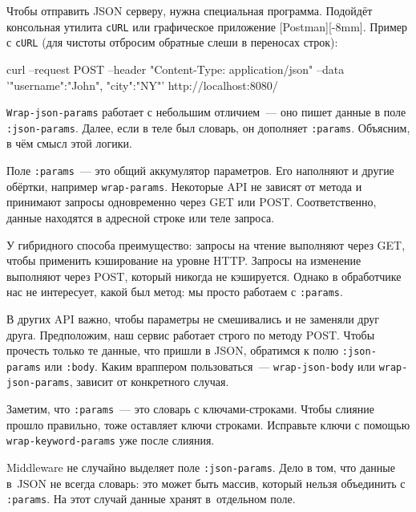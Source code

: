 \fi


Чтобы отправить JSON серверу, нужна специальная программа. Подойдёт консольная
утилита \verb|cURL| или графическое приложение
[Post\-man][-8mm]. Пример с
\verb|cURL| (для чистоты отбросим обратные слеши в переносах строк):

\begin{english}
  \begin{bash}
curl --request POST
     --header "Content-Type:
                 application/json"
     --data '{"username":"John",
                      "city":"NY"}'
     http://localhost:8080/
  \end{bash}
\end{english}

\mnoindent \verb|Wrap-json-params| работает с небольшим отличием~--- оно пишет
данные в поле \verb|:json-params|. Далее, если в теле был словарь, он дополняет
\verb|:params|. Объясним, в чём смысл этой логики.

Поле \verb|:params|~--- это общий аккумулятор параметров. Его наполняют и другие
обёртки, например \verb|wrap-params|. Некоторые API не зависят от метода и
принимают запросы одновременно через GET или POST. Соответственно, данные
находятся в адресной строке или теле запроса.

У гибридного способа преимущество: запросы на чтение выполняют через GET, чтобы
применить кэширование на уровне HTTP. Запросы на изменение выполняют через POST,
который никогда не кэшируется. Однако в обработчике нас не интересует, какой был
метод: мы просто работаем с \verb|:params|.

В других API важно, чтобы параметры не смешивались и не заменяли друг
друга. Предположим, наш сервис работает строго по методу POST. Чтобы прочесть
только те данные, что пришли в JSON, обратимся к полю \verb|:json-params| или
\verb|:body|. Каким враппером пользоваться~--- \verb|wrap-json-body| или
\verb|wrap-json-params|, зависит от конкретного случая.


Заметим, что \verb|:params|~--- это словарь с клю\-ча\-ми-стро\-ка\-ми. Чтобы слияние
прошло правильно, \verb|| тоже оставляет ключи
строками. Исправьте ключи с помощью \texttt{wrap-keyword-params} уже после
слияния.

Middleware не случайно выделяет поле \texttt{:json\--pa\-rams}. Дело в том, что данные
в~JSON не всегда словарь: это может быть массив, который нельзя объединить с
\verb|:params|. На этот случай данные хранят в~отдельном поле.

